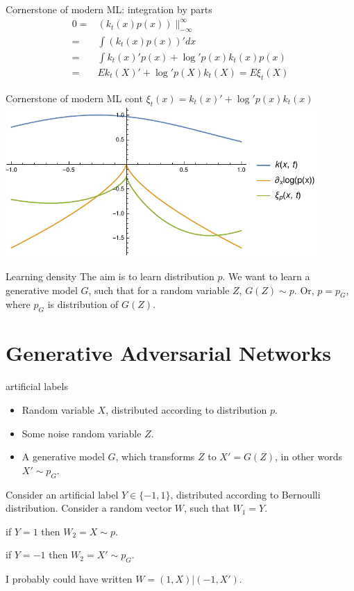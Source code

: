 \documentclass{beamer}
\begin{document}
  \begin{frame}{Cornerstone of modern ML: integration by parts}
\begin{align*}
 0= & ( k_t(x) p(x) ) \|_{-\infty}^{\infty} \\
   = &  \int ( k_t(x) p(x) )' dx \\
   = &  \int  k_t(x)' p(x)   + \log' p(x)k_t(x) p(x) \\
   = & E k_t(X)'    + \log' p(X)k_t(X) =E \xi_t(X) 
\end{align*}
 \end{frame} 
  
 \begin{frame}{Cornerstone of modern ML cont}
$\xi_t(x) =k_t(x)'    + \log' p(x)k_t(x) $ \\
 \includegraphics[width=0.9\textwidth]{./img/xi.pdf} 
 \end{frame} 
  
  
\begin{frame}{Learning density}
The aim is to learn distribution $p$.
We want to  learn a generative model $G$, such that for a random variable $Z$, $G(Z) \sim p$.
Or, $p = p_G$, where $p_G$ is distribution of $G(Z)$.
\end{frame}
  
\section{Generative Adversarial Networks}
  
\begin{frame}{artificial  labels}
  \begin{itemize}
   \item Random variable  $X$, distributed according to distribution $p$. 
   \item Some noise random variable $Z$.
   \item A generative model $G$, which transforms $Z$ to $X' = G(Z)$, in other words  $X' \sim p_{G}$.
\end{itemize}

Consider an artificial  label   $Y \in \{ -1,1 \}$, distributed according to Bernoulli distribution. 
Consider a random vector $W$, such that $W_1 = Y$.  

if $Y=1$  then  $W_2 =X \sim p$.

if $Y=-1$  then $W_2 =X' \sim p_G$.

I probably could have written $W  = (1,X) | (-1,X')$.

\end{frame}
  
\end{document}

